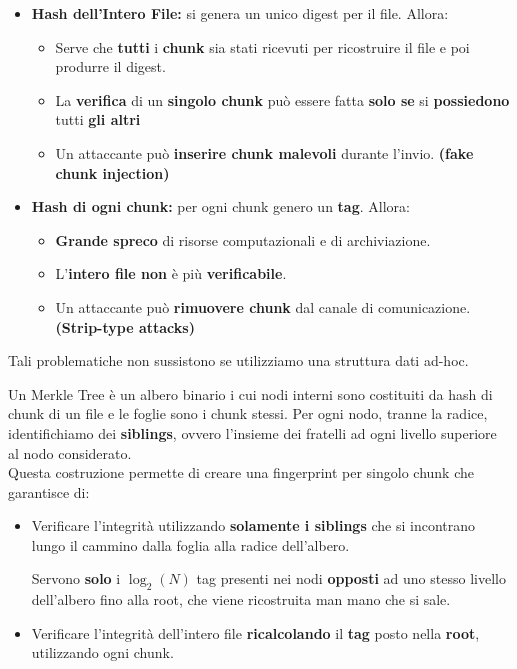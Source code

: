 \begin{itemize}
    \item \textbf{Hash dell'Intero File:} si genera un unico digest per il file. Allora:
    \begin{itemize}
        \item [\textcolor{red}{\ding{55}}]Serve che \textbf{tutti} i \textbf{chunk} sia stati ricevuti per ricostruire il file e poi produrre il digest.
        \item [\textcolor{red}{\ding{55}}]La \textbf{verifica} di un \textbf{singolo chunk} può essere fatta \textbf{solo se} si \textbf{possiedono} tutti \textbf{gli altri}
        \item [\textcolor{red}{\ding{55}}]Un attaccante può \textbf{inserire chunk malevoli} durante l'invio. \textbf{(fake chunk injection)}
    \end{itemize}
    \item \textbf{Hash di ogni chunk:} per ogni chunk genero un \textbf{tag}. Allora:
    \begin{itemize}
        \item [\textcolor{red}{\ding{55}}]\textbf{Grande spreco} di risorse computazionali e di archiviazione.
        \item [\textcolor{red}{\ding{55}}]L'\textbf{intero file non} è più \textbf{verificabile}.
        \item [\textcolor{red}{\ding{55}}]Un attaccante può \textbf{rimuovere chunk} dal canale di comunicazione. \textbf{(Strip-type attacks)}
    \end{itemize}
\end{itemize}
Tali problematiche non sussistono se utilizziamo una struttura dati ad-hoc.
\begin{definition}
Un Merkle Tree è un albero binario i cui nodi interni sono costituiti da hash di chunk di un file e le foglie sono i chunk stessi. Per ogni nodo, tranne la radice, identifichiamo dei \textbf{siblings}, ovvero l'insieme dei fratelli ad ogni livello superiore al nodo considerato.\\
Questa costruzione permette di creare una fingerprint per singolo chunk che garantisce di:
\begin{itemize}
    \item Verificare l'integrità utilizzando \textbf{solamente i siblings} che si incontrano lungo il cammino dalla foglia alla radice dell'albero.\\
    \begin{remark}
    Servono \textbf{solo} i $\log_2(N)$ tag presenti nei nodi \textbf{opposti} ad uno stesso livello dell'albero fino alla root, che viene ricostruita man mano che si sale.
    \end{remark}
    \item Verificare l'integrità dell'intero file \textbf{ricalcolando} il \textbf{tag} posto nella \textbf{root}, utilizzando ogni chunk. 
\end{itemize}
\end{definition}
